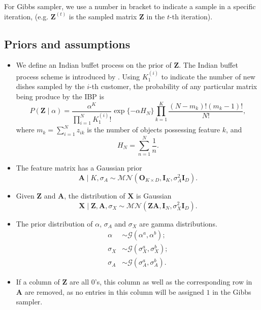 \documentclass{article}
\begin{document}
For Gibbs sampler, we use a number in bracket to indicate a sample in a specific iteration, (e.g. $\mathbf{Z}^{(t)}$ is the sampled matrix $\mathbf{Z}$ in the $t$-th iteration).

\subsection{Priors and assumptions}
\begin{itemize}
  \item We define an Indian buffet process on the prior of $\mathbf{Z}$. The Indian buffet process scheme is introduced by \citet[Sec 2.4]{griffiths2005infinite}. Using $K_1^{(i)}$ to indicate the number of new dishes sampled by the $i$-th customer, the probability of any particular matrix being produce by the IBP is $$P(\mathbf{Z}\mid\alpha) = \frac{\alpha^{K}}{\prod_{i=1}^NK_1^{(i)}!}\exp\{-\alpha H_N\}\prod_{k=1}^K\frac{(N - m_k)!(m_k - 1)!}{N!},$$
  where $m_k = \sum_{i=1}^N z_{ik}$ is the number of objects possessing feature $k$, and $$H_N = \sum_{n = 1}^N\frac{1}{n}.$$
  \item The feature matrix has a Gaussian prior $$\mathbf{A}\mid K, \sigma_A\sim \mathcal{MN}(\mathbf{O}_{K\times D}, \mathbf{I}_K, \sigma_A^2\mathbf{I}_D).$$
  \item Given $\mathbf{Z}$ and $\mathbf{A}$, the distribution of $\mathbf{X}$ is Gaussian $$\mathbf{X}\mid \mathbf{Z}, \mathbf{A}, \sigma_X \sim \mathcal{MN}(\mathbf{ZA}, \mathbf{I}_N, \sigma_X^2\mathbf{I}_D).$$
  \item The prior distribution of $\alpha$, $\sigma_A$ and $\sigma_X$ are gamma distributions.
  $$
  \begin{aligned}
    \alpha &\sim \mathcal{G}(\alpha^a, \alpha^b);\\
    \sigma_X &\sim \mathcal{G}(\sigma_X^a,\sigma_X^b);\\
    \sigma_A &\sim \mathcal{G}(\sigma_A^a, \sigma_A^b).
  \end{aligned}
  $$
  \item If a column of $\mathbf{Z}$ are all $0$'s, this column as well as the corresponding row in $\mathbf{A}$ are removed, as no entries in this column will be assigned $1$ in the Gibbs sampler.
\end{itemize}
\end{document}
